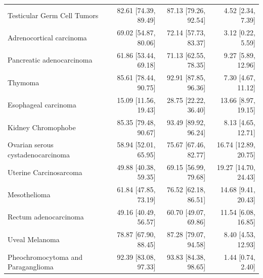\begin{tabular}{@{}p{6cm}rrr@{}}
Testicular Germ Cell Tumors & 82.61 [74.39, 89.49] & 87.13 [79.26, 92.54] & 4.52 [2.34, 7.39] \\
Adrenocortical carcinoma & 69.02 [54.87, 80.06] & 72.14 [57.73, 83.37] & 3.12 [0.22, 5.59] \\
Pancreatic adenocarcinoma & 61.86 [53.44, 69.18] & 71.13 [62.55, 78.35] & 9.27 [5.89, 12.96] \\
Thymoma & 85.61 [78.44, 90.75] & 92.91 [87.85, 96.36] & 7.30 [4.67, 11.12] \\
Esophageal carcinoma & 15.09 [11.56, 19.43] & 28.75 [22.22, 36.40] & 13.66 [8.97, 19.15] \\
Kidney Chromophobe & 85.35 [79.48, 90.67] & 93.49 [89.92, 96.24] & 8.13 [4.65, 12.71] \\
Ovarian serous cystadenocarcinoma & 58.94 [52.01, 65.95] & 75.67 [67.46, 82.77] & 16.74 [12.89, 20.75] \\
Uterine Carcinosarcoma & 49.88 [40.38, 59.35] & 69.15 [56.99, 79.68] & 19.27 [14.70, 24.43] \\
Mesothelioma & 61.84 [47.85, 73.19] & 76.52 [62.18, 86.51] & 14.68 [9.41, 20.43] \\
Rectum adenocarcinoma & 49.16 [40.49, 56.57] & 60.70 [49.07, 69.86] & 11.54 [6.08, 16.85] \\
Uveal Melanoma & 78.87 [67.90, 88.45] & 87.28 [79.07, 94.58] & 8.40 [4.53, 12.93] \\
Pheochromocytoma and Paraganglioma & 92.39 [83.08, 97.33] & 93.83 [84.38, 98.65] & 1.44 [0.74, 2.40] \\
\bottomrule
\end{tabular}
